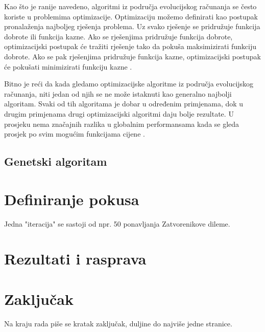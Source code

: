\documentclass[zavrsnirad]{fer}
\begin{document}
		Kao što je ranije navedeno, algoritmi iz područja evolucijskog računanja se često koriste u problemima optimizacije. Optimizaciju možemo definirati kao postupak pronalaženja najboljeg rješenja problema. Uz svako rješenje se pridružuje funkcija dobrote ili funkcija kazne. Ako se rješenjima pridružuje funkcija dobrote, optimizacijski postupak će tražiti rješenje tako da pokuša maksimizirati funkciju dobrote. Ako se pak rješenjima pridružuje funkcija kazne, optimizacijski postupak će pokušati minimizirati funkciju kazne \cite{skriptaEvolucijskoRacunarstvo}.

		Bitno je reći da kada gledamo optimizacijske algoritme iz područja evolucijskog računanja, niti jedan od njih se ne može istaknuti kao generalno najbolji algoritam. Svaki od tih algoritama je dobar u određenim primjenama, dok u drugim primjenama drugi optimizacijski algoritmi daju bolje rezultate. U prosjeku nema značajnih razlika u globalnim performansama kada se gleda prosjek po svim mogućim funkcijama cijene \cite{skriptaEvolucijskoRacunarstvo}.
	
	\section{Genetski algoritam}
	
		
	
	
\chapter{Definiranje pokusa}

	Jedna "iteracija" se sastoji od npr. 50 ponavljanja Zatvorenikove dileme.




\chapter{Rezultati i rasprava}
\label{pog:rezultati_i_rasprava}



\chapter{Zaključak}
\label{pog:zakljucak}

Na kraju rada piše se kratak zaključak, duljine do najviše jedne stranice. 
\end{document}
